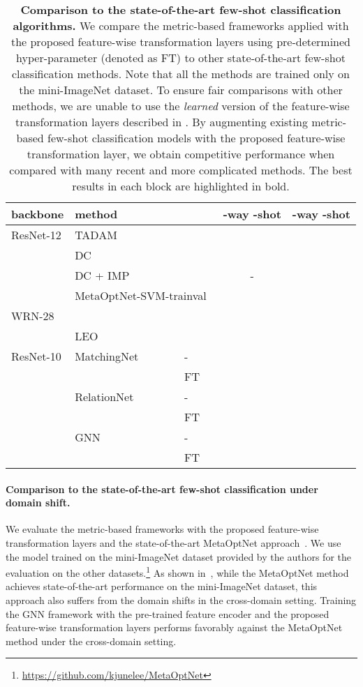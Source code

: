 \begin{table}[t]\footnotesize
	\centering
	\caption{\textbf{Comparison to the state-of-the-art few-shot classification algorithms.} We compare the metric-based frameworks applied with the proposed feature-wise transformation layers using pre-determined hyper-parameter  (denoted as FT) to other state-of-the-art few-shot classification methods. Note that all the methods are trained only on the mini-ImageNet dataset. To ensure fair comparisons with other methods, we are unable to use the \emph{learned} version of the feature-wise transformation layers described in . By augmenting existing metric-based few-shot classification models with the proposed feature-wise transformation layer, we obtain competitive performance when compared with many recent and more complicated methods. The best results in each block are highlighted in bold.}
	\begin{tabular}{ll l cc} 
	    \toprule
	    backbone & method &  & -way -shot & -way -shot \\
	    \midrule
	    ResNet-12 & \multicolumn{2}{l}{TADAM~\citep{oreshkin2018tadam}} &  &  \\
	    & \multicolumn{2}{l}{DC~\citep{lifchitz2019dense}} &  &  \\
	    & \multicolumn{2}{l}{DC + IMP~\citep{lifchitz2019dense}} & - &  \\
	    & \multicolumn{2}{l}{MetaOptNet-SVM-trainval~\citep{lee2019rr}} &  &  \\
	    WRN-28 & \multicolumn{2}{l}{\citet{qiao2018few}} &  &  \\
	    & \multicolumn{2}{l}{LEO~\citep{rusu2018leo}} &  &  \\
	    \midrule
	    ResNet-10 & MatchingNet & - &  &  \\
		& & FT &  &  \\
		& RelationNet & - &  &  \\
		& & FT &  &  \\
		& GNN & - &  &  \\
		& & FT &  &  \\
		\bottomrule 
	\end{tabular}
	\label{tab:sota}
\end{table}

\paragraph{Comparison to the state-of-the-art few-shot classification under domain shift.}
We evaluate the metric-based frameworks with the proposed feature-wise transformation layers and the state-of-the-art MetaOptNet approach~\cite{lee2019rr}.
We use the model trained on the mini-ImageNet dataset provided by the authors for the evaluation on the other datasets.\footnote{\url{https://github.com/kjunelee/MetaOptNet}}
As shown in~, while the MetaOptNet method achieves state-of-the-art performance on the mini-ImageNet dataset, this approach also suffers from the domain shifts in the cross-domain setting.
Training the GNN framework with the pre-trained feature encoder and the proposed feature-wise transformation layers performs favorably against the MetaOptNet method under the cross-domain setting.

